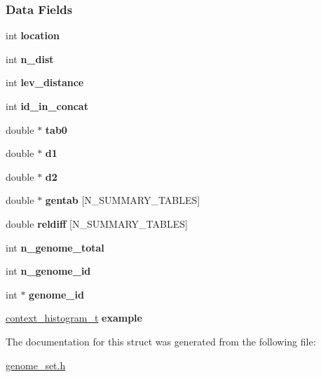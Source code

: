 \subsubsection*{Data Fields}
\begin{DoxyCompactItemize}
\item 
\mbox{\label{structg__tract__t_afd60848ec0049f7b9d4add8edf9db069}} 
int {\bfseries location}
\item 
\mbox{\label{structg__tract__t_a4ab5988d924fddb965685b3ec2fccd47}} 
int {\bfseries n\+\_\+dist}
\item 
\mbox{\label{structg__tract__t_a8ce546dea993cb52c82f670938d1aa89}} 
int {\bfseries lev\+\_\+distance}
\item 
\mbox{\label{structg__tract__t_a2bf7959c381283c3ff7e6b5266f06b70}} 
int {\bfseries id\+\_\+in\+\_\+concat}
\item 
\mbox{\label{structg__tract__t_a58281833b4843de8f486e063016c0701}} 
double $\ast$ {\bfseries tab0}
\item 
\mbox{\label{structg__tract__t_a420632c16a20c521397aad781077427a}} 
double $\ast$ {\bfseries d1}
\item 
\mbox{\label{structg__tract__t_a2d02b9086eee01128bdfc2997779ea54}} 
double $\ast$ {\bfseries d2}
\item 
\mbox{\label{structg__tract__t_ac1f6d1d94709bbbb7e2bbb0b46254b3e}} 
double $\ast$ {\bfseries gentab} \mbox{[}N\+\_\+\+S\+U\+M\+M\+A\+R\+Y\+\_\+\+T\+A\+B\+L\+ES\mbox{]}
\item 
\mbox{\label{structg__tract__t_a51eaf79b82a695bdbfd78d7937b79fb6}} 
double {\bfseries reldiff} \mbox{[}N\+\_\+\+S\+U\+M\+M\+A\+R\+Y\+\_\+\+T\+A\+B\+L\+ES\mbox{]}
\item 
\mbox{\label{structg__tract__t_a6069f307c3bc75cb7b4091cb65c74b29}} 
int {\bfseries n\+\_\+genome\+\_\+total}
\item 
\mbox{\label{structg__tract__t_a3ddb2ee7a494bcc39607345a121cf72d}} 
int {\bfseries n\+\_\+genome\+\_\+id}
\item 
\mbox{\label{structg__tract__t_a38147086e95f9e9c9ab150dbd92942bd}} 
int $\ast$ {\bfseries genome\+\_\+id}
\item 
\mbox{\label{structg__tract__t_acee1737b10a17ffb6ae86bf242eff83c}} 
\hyperlink{structcontext__histogram__struct}{context\+\_\+histogram\+\_\+t} {\bfseries example}
\end{DoxyCompactItemize}


The documentation for this struct was generated from the following file\+:\begin{DoxyCompactItemize}
\item 
\hyperlink{genome__set_8h}{genome\+\_\+set.\+h}\end{DoxyCompactItemize}
